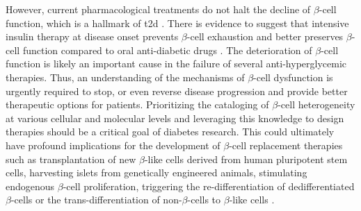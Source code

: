 \par However, current pharmacological treatments do not halt the decline of $\beta$-cell function, which is a hallmark of \gls{t2d} . There is evidence to suggest that intensive insulin therapy at disease onset prevents $\beta$-cell exhaustion and better preserves $\beta$-cell function compared to oral anti-diabetic drugs \textbf{\cite{wysham_beta-cell_2020}}. The deterioration of $\beta$-cell function is likely an important cause in the failure of several anti-hyperglycemic therapies. Thus, an understanding of the mechanisms of $\beta$-cell dysfunction is urgently required to stop, or even reverse disease progression and provide better therapeutic options for patients. Prioritizing the cataloging of $\beta$-cell heterogeneity at various cellular and molecular levels and leveraging this knowledge to design therapies should be a critical goal of diabetes research. This could ultimately have profound implications for the development of $\beta$-cell replacement therapies such as transplantation of new $\beta$-like cells derived from human pluripotent stem cells, harvesting islets from genetically engineered animals, stimulating endogenous $\beta$-cell proliferation, triggering the re-differentiation of dedifferentiated $\beta$-cells or the trans-differentiation of non-$\beta$-cells to $\beta$-like cells \textbf{\cite{zhou_pancreas_2018}}.\\

